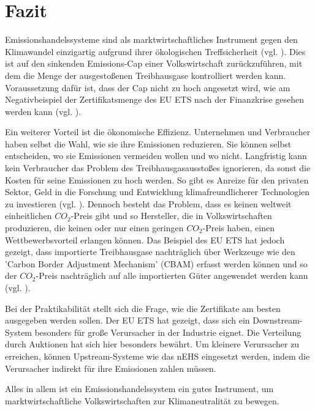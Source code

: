 \chapter{Fazit}

Emissionshandelssysteme sind als marktwirtschaftliches Instrument gegen den Klimawandel einzigartig aufgrund ihrer ökologischen Treffsicherheit (vgl. \cite[S. 182]{hubert.2020}).
Dies ist auf den sinkenden Emissions-Cap einer Volkswirtschaft zurückzuführen, mit dem die Menge der ausgestoßenen Treibhausgase kontrolliert werden kann.
Voraussetzung dafür ist, dass der Cap nicht zu hoch angesetzt wird, wie am Negativbeispiel der Zertifikatsmenge des EU ETS nach der Finanzkrise gesehen werden kann (vgl. \cite{eu3.2023}).

Ein weiterer Vorteil ist die ökonomische Effizienz. Unternehmen und Verbraucher haben selbst die Wahl, wie sie ihre Emissionen reduzieren.
Sie können selbst entscheiden, wo sie Emissionen vermeiden wollen und wo nicht. Langfristig kann kein Verbraucher das Problem des Treibhausgasausstoßes ignorieren, da sonst die Kosten für seine Emissionen zu hoch werden.
So gibt es Anreize für den privaten Sektor, Geld in die Forschung und Entwicklung klimafreundlicherer Technologien zu investieren (vgl. \cite[S. 183]{hubert.2020}).
Dennoch besteht das Problem, dass es keinen weltweit einheitlichen $CO_2$-Preis gibt und so Hersteller, die in Volkswirtschaften produzieren, die keinen oder nur einen geringen $CO_2$-Preis haben, einen Wettbewerbsvorteil erlangen können.
Das Beispiel des EU ETS hat jedoch gezeigt, dass importierte Treibhausgase nachträglich über Werkzeuge wie den 'Carbon Border Adjustment Mechanism' (CBAM) erfasst werden können und so der $CO_2$-Preis nachträglich auf alle importierten Güter angewendet werden kann (vgl. \cite{ub.2023}).

Bei der Praktikabilität stellt sich die Frage, wie die Zertifikate am besten ausgegeben werden sollen. Der EU ETS hat gezeigt, dass sich ein Downstream-System besonders für große Verursacher in der Industrie eignet.
Die Verteilung durch Auktionen hat sich hier besonders bewährt. Um kleinere Verursacher zu erreichen, können Upstream-Systeme wie das nEHS eingesetzt werden, indem die Verursacher indirekt für ihre Emissionen zahlen müssen.

Alles in allem ist ein Emissionshandelssystem ein gutes Instrument, um marktwirtschaftliche Volkswirtschaften zur Klimaneutralität zu bewegen.